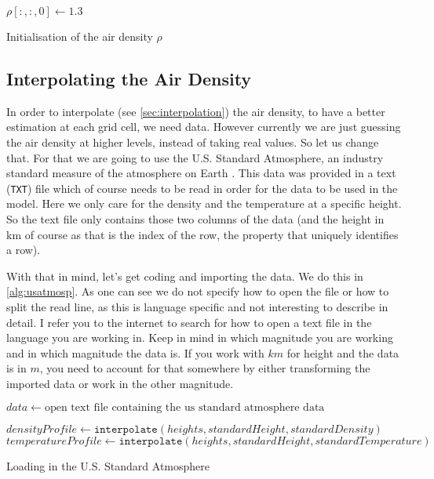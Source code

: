 \begin{algorithm}
    $\rho[:, :, 0] \leftarrow 1.3$ \;
    \caption{Initialisation of the air density $\rho$}
    \label{alg:density}
\end{algorithm}

\subsection{Interpolating the Air Density}
In order to interpolate (see \autoref{sec:interpolation}) the air density, to have a better estimation at each grid cell, we need data. However currently we are just guessing the air density at 
higher levels, instead of taking real values. So let us change that. For that we are going to use the U.S. Standard Atmosphere, an industry standard measure of the atmosphere on Earth 
\cite{usatmosp}. This data was provided in a text (\texttt{TXT}) file which of course needs to be read in order for the data to be used in the model. Here we only care for the density and the 
temperature at a specific height. So the text file only contains those two columns of the data (and the height in km of course as that is the index of the row, the property that uniquely 
identifies a row).

With that in mind, let's get coding and importing the data. We do this in \autoref{alg:usatmosp}. As one can see we do not specify how to open the file or how to split the read line, as this 
is language specific and not interesting to describe in detail. I refer you to the internet to search for how to open a text file in the language you are working in. Keep in mind in which 
magnitude you are working and in which magnitude the data is. If you work with $km$ for height and the data is in $m$, you need to account for that somewhere by either transforming the imported 
data or work in the other magnitude. 

\begin{algorithm}
    $data \leftarrow \text{open text file containing the us standard atmosphere data}$ \;

    $densityProfile \leftarrow \texttt{interpolate}(heights, standardHeight, standardDensity)$ \;
    $temperatureProfile \leftarrow \texttt{interpolate}(heights, standardHeight, standardTemperature)$ \;

    \caption{Loading in the U.S. Standard Atmosphere}
    \label{alg:usatmosp}
\end{algorithm}

